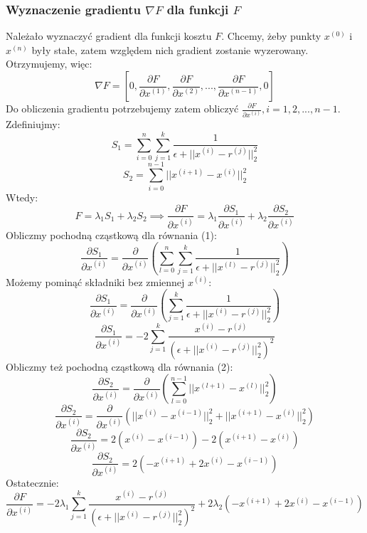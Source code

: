 \documentclass{article}
\begin{document}
\subsubsection{Wyznaczenie gradientu $\nabla F$ dla funkcji $F$}
Należało wyznaczyć gradient dla funkcji kosztu $F$. Chcemy, żeby punkty $x^{(0)}$ i $x^{(n)}$ były stałe, zatem względem nich gradient zostanie wyzerowany. Otrzymujemy, więc:
$$\nabla F = [0, \frac{\partial F}{\partial x^{(1)}}, \frac{\partial F}{\partial x^{(2)}}, ..., \frac{\partial F}{\partial x^{(n-1)}}, 0]$$
Do obliczenia gradientu potrzebujemy zatem obliczyć $\frac{\partial F}{\partial x^{(i)}}, i=1,2,...,n-1$. Zdefiniujmy:
\begin{equation}
    S_1 = \sum_{i=0}^n\sum_{j=1}^k\frac{1}{\epsilon+||x^{(i)}-r^{(j)}||^2_2}
\end{equation}
\begin{equation}
    S_2 = \sum_{i=0}^{n-1}||x^{(i+1)}-x^{(i)}||^2_2
\end{equation}
Wtedy:
$$F = \lambda_1S_1 + \lambda_2S_2 \implies \frac{\partial F}{\partial x^{(i)}} = \lambda_1\frac{\partial S_1}{\partial x^{(i)}} + \lambda_2\frac{\partial S_2}{\partial x^{(i)}}$$
Obliczmy pochodną cząstkową dla równania (1):
$$\frac{\partial S_1}{\partial x^{(i)}} = \frac{\partial}{\partial x^{(i)}}(\sum_{l=0}^n\sum_{j=1}^k\frac{1}{\epsilon+||x^{(l)}-r^{(j)}||^2_2})$$
Możemy pominąć składniki bez zmiennej $x^{(i)}$:
$$\frac{\partial S_1}{\partial x^{(i)}} = \frac{\partial}{\partial x^{(i)}}(\sum_{j=1}^k\frac{1}{\epsilon+||x^{(i)}-r^{(j)}||^2_2})$$
$$\frac{\partial S_1}{\partial x^{(i)}} = -2\sum_{j=1}^k\frac{x^{(i)}-r^{(j)}}{(\epsilon+||x^{(i)}-r^{(j)}||^2_2)^2}$$
Obliczmy też pochodną cząstkową dla równania (2):
$$\frac{\partial S_2}{\partial x^{(i)}} = \frac{\partial}{\partial x^{(i)}}(\sum_{l=0}^{n-1}||x^{(l+1)}-x^{(l)}||^2_2)$$
$$\frac{\partial S_2}{\partial x^{(i)}} = \frac{\partial}{\partial x^{(i)}}(||x^{(i)}-x^{(i-1)}||^2_2 + ||x^{(i+1)}-x^{(i)}||^2_2)$$
$$\frac{\partial S_2}{\partial x^{(i)}} = 2(x^{(i)}-x^{(i-1)}) - 2(x^{(i+1)}-x^{(i)})$$
$$\frac{\partial S_2}{\partial x^{(i)}} = 2(-x^{(i+1)}+2x^{(i)}-x^{(i-1)})$$
Ostatecznie:
$$\frac{\partial F}{\partial x^{(i)}} = -2\lambda_1\sum_{j=1}^k\frac{x^{(i)}-r^{(j)}}{(\epsilon+||x^{(i)}-r^{(j)}||^2_2)^2} + 2\lambda_2(-x^{(i+1)}+2x^{(i)}-x^{(i-1)})$$
\end{document}
